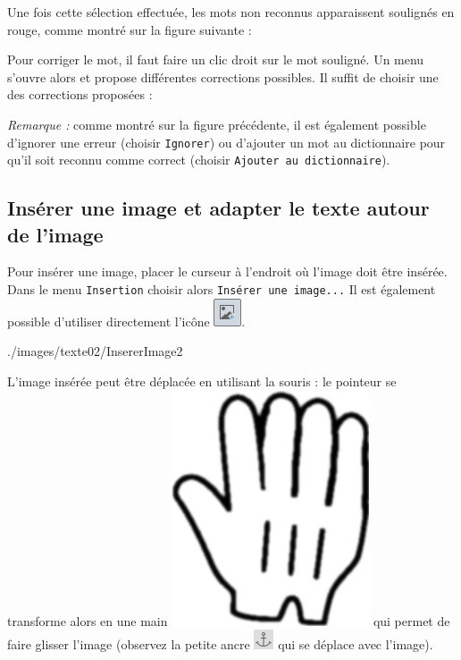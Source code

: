 
Une fois cette sélection effectuée, les mots non reconnus apparaissent soulignés en rouge, comme montré sur la figure suivante :


Pour corriger le mot, il faut faire un clic droit sur le mot souligné. Un menu s'ouvre alors et propose différentes corrections possibles. Il suffit de choisir une des corrections proposées :


\emph{Remarque :} comme montré sur la figure précédente, il est également possible d'ignorer une erreur (choisir \texttt{Ignorer}) ou d'ajouter un mot au dictionnaire pour qu'il soit reconnu comme correct (choisir \texttt{Ajouter au dictionnaire}).    




\subsection{Insérer une image et adapter le texte autour de l'image}\label{Texte2InsererImage}

Pour insérer une image, placer le curseur à l'endroit où l'image doit être insérée. Dans le menu \texttt{Insertion} choisir alors \texttt{Insérer une image...} Il est également possible d'utiliser directement l'icône \includegraphics[width=.6cm]{./images/texte02/iconeInsererImage}. 

%
              {./images/texte02/InsererImage2}{\textwidth}

L'image insérée peut être déplacée en utilisant la souris : le pointeur se transforme alors en une main \includegraphics[width=.3cm]{./images/texte02/pointeurMain} qui permet de faire glisser l'image (observez la petite ancre \includegraphics[width=.4cm]{./images/texte02/iconeAncre} qui se déplace avec l'image).



